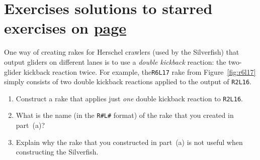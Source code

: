 \section*{Exercises \hfill \normalfont\textsf{\small solutions to starred exercises on \hyperlink{solutions_self_support_spaceships}{page \pageref{solutions_self_support_spaceships}}}}
\label{sec:solutions_self_support_spaceships}
\vspace*{-0.4cm}\hrulefill\vspace*{-0.3cm}\footnotesize\begin{multicols}{2}\vspace*{-0.4cm}\raggedcolumns{}
\setlength{\parskip}{0pt}


\begin{problemstar}\label{exer:self_support_spaceships_r4l1}
	One way of creating rakes for Herschel crawlers (used by the Silverfish) that output gliders on different lanes is to use a \emph{double kickback} reaction: the two-glider kickback reaction twice. For example, the\texttt{R6L17} rake from Figure~\ref{fig:r6l17} simply consists of two double kickback reactions applied to the output of \texttt{R2L16}.
	
	\begin{enumerate}[label=\bf\color{ocre}(\alph*)]
		\item Construct a rake that applies just \emph{one} double kickback reaction to \texttt{R2L16}.
		
		\item What is the name (in the \texttt{R\#L\#} format) of the rake that you created in part~(a)?
		
		\item Explain why the rake that you constructed in part~(a) is not useful when constructing the Silverfish.
	\end{enumerate}
\end{problemstar}


\end{multicols}
\normalsize\vspace*{0.01cm}
